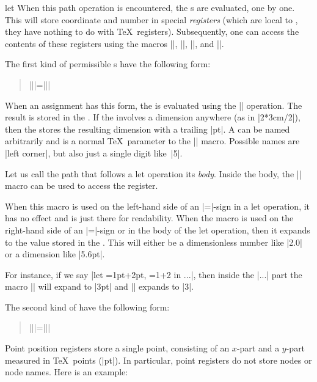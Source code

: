 \begin{pathoperation}{let}{
    }
  When this path operation is encountered, the s are
  evaluated, one by one. This will store coordinate and number in
  special \emph{registers} (which are local to \tikzname, they have
  nothing to do with \TeX\ registers). Subsequently, one can access the
  contents of these registers using the macros |\p|, |\x|, |\y|, and
  |\n|.

  The first kind of permissible s have the following
  form:
  \begin{quote}
    |\n||={||}|
  \end{quote}
  When an assignment has this form, the  is evaluated
  using the |\pgfmathparse| operation. The result is stored in the
  . If the  involves a dimension
  anywhere (as in |2*3cm/2|), then the  stores
  the resulting dimension with a trailing |pt|.  A  can
  be named arbitrarily and is a normal \TeX\  parameter to the |\n|
  macro. Possible names are |{left corner}|, but also just a single
  digit like~|5|.

  Let us call the path that follows a let operation its
  \emph{body}. Inside the body, the |\n| macro can be used to access
  the register.
  \begin{command}{\n{}}
    When this macro is used on the left-hand side of an |=|-sign in a
    let operation, it has no effect and is just there for
    readability. When the macro is used on the right-hand side of an
    |=|-sign or in the body of the let operation, then it expands to
    the value stored in the . This will either
    be a dimensionless number like |2.0| or a dimension like |5.6pt|.

    For instance, if we say |let ={1pt+2pt}, ={1+2} in ...|, then
    inside the |...| part the macro || will expand to |3pt| and
    || expands to |3|.
  \end{command}

  The second kind of  have the following form:
  \begin{quote}
    |\p||={||}|
  \end{quote}
  Point position registers store a single point, consisting
  of an $x$-part and a $y$-part measured in \TeX\ points (|pt|). In
  particular, point registers do not store nodes or node names.
  Here is an example:
\begin{codeexample}[]
\end{codeexample}
\end{pathoperation}
